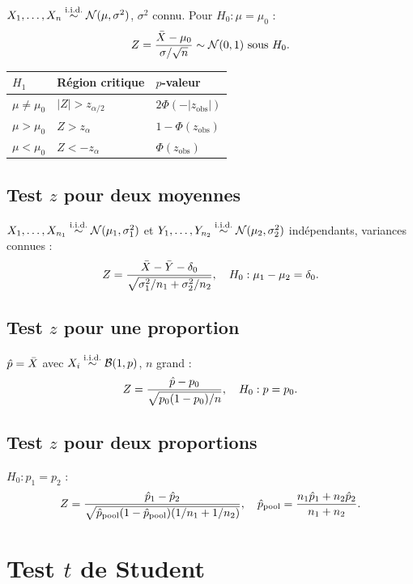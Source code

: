 \begin{theoreme}
$X_1,\ldots,X_n\overset{\text{i.i.d.}}{\sim}\mathcal{N}(\mu,\sigma^2)$, $\sigma^2$ connu. Pour $H_0:\mu=\mu_0$ :
\[
Z = \frac{\bar{X}-\mu_0}{\sigma/\sqrt{n}} \sim \mathcal{N}(0,1) \text{ sous } H_0.
\]
\begin{center}
\begin{tabular}{lll}
\toprule
$H_1$ & R\'egion critique & $p$-valeur \\
\midrule
$\mu\neq\mu_0$ & $|Z|>z_{\alpha/2}$ & $2\Phi(-|z_{\mathrm{obs}}|)$ \\
$\mu>\mu_0$ & $Z>z_\alpha$ & $1-\Phi(z_{\mathrm{obs}})$ \\
$\mu<\mu_0$ & $Z<-z_\alpha$ & $\Phi(z_{\mathrm{obs}})$ \\
\bottomrule
\end{tabular}
\end{center}
\end{theoreme}

\subsection{Test $z$ pour deux moyennes}

$X_1,\ldots,X_{n_1}\overset{\text{i.i.d.}}{\sim}\mathcal{N}(\mu_1,\sigma_1^2)$ et $Y_1,\ldots,Y_{n_2}\overset{\text{i.i.d.}}{\sim}\mathcal{N}(\mu_2,\sigma_2^2)$ ind\'ependants, variances connues :
\[
Z = \frac{\bar{X}-\bar{Y}-\delta_0}{\sqrt{\sigma_1^2/n_1+\sigma_2^2/n_2}}, \quad H_0:\mu_1-\mu_2=\delta_0.
\]

\subsection{Test $z$ pour une proportion}

$\hat{p}=\bar{X}$ avec $X_i\overset{\text{i.i.d.}}{\sim}\mathcal{B}(1,p)$, $n$ grand :
\[
Z = \frac{\hat{p}-p_0}{\sqrt{p_0(1-p_0)/n}}, \quad H_0:p=p_0.
\]

\subsection{Test $z$ pour deux proportions}

$H_0:p_1=p_2$ :
\[
Z = \frac{\hat{p}_1-\hat{p}_2}{\sqrt{\hat{p}_{\mathrm{pool}}(1-\hat{p}_{\mathrm{pool}})(1/n_1+1/n_2)}}, \quad \hat{p}_{\mathrm{pool}}=\frac{n_1\hat{p}_1+n_2\hat{p}_2}{n_1+n_2}.
\]

\section{Test $t$ de Student}
\label{sec:test-t}

